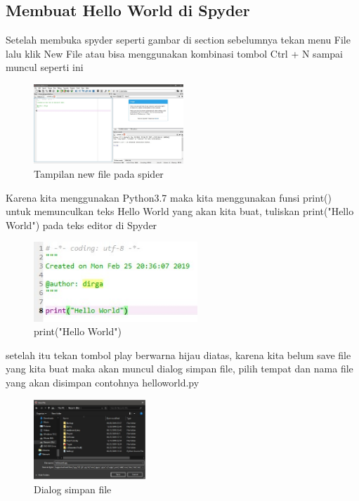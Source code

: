 \subsection{Membuat Hello World di Spyder}
Setelah membuka spyder seperti gambar di section sebelumnya tekan menu File lalu klik New File atau bisa menggunakan kombinasi tombol Ctrl + N sampai muncul seperti ini

\begin{figure}[!htbp]
  \centering
  \includegraphics[height=3cm]{chapters/gambar/gambarnewfile.jpg}
  \caption{Tampilan new file pada spider}
\end{figure}

Karena kita menggunakan Python3.7 maka kita menggunakan funsi print() untuk memunculkan teks Hello World yang akan kita buat, tuliskan print("Hello World") pada teks editor di Spyder

\begin{figure}[!htbp]
  \centering
  \includegraphics[height=3cm]{chapters/gambar/gambarprint.jpg}
  \caption{print("Hello World")}
\end{figure}

setelah itu tekan tombol play berwarna hijau diatas, karena kita belum save file yang kita buat maka akan muncul dialog simpan file, pilih tempat dan nama file yang akan disimpan contohnya helloworld.py

\begin{figure}[!htbp]
  \centering
  \includegraphics[height=3cm]{chapters/gambar/helloworld.jpg}
  \caption{Dialog simpan file}
\end{figure}

